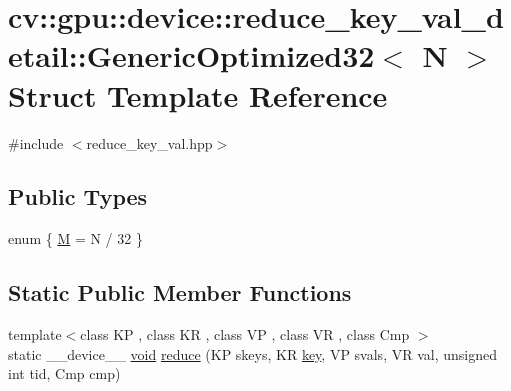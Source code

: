 \hypertarget{structcv_1_1gpu_1_1device_1_1reduce__key__val__detail_1_1GenericOptimized32}{\section{cv\-:\-:gpu\-:\-:device\-:\-:reduce\-\_\-key\-\_\-val\-\_\-detail\-:\-:Generic\-Optimized32$<$ N $>$ Struct Template Reference}
\label{structcv_1_1gpu_1_1device_1_1reduce__key__val__detail_1_1GenericOptimized32}
}


{\ttfamily \#include $<$reduce\-\_\-key\-\_\-val.\-hpp$>$}

\subsection*{Public Types}
\begin{DoxyCompactItemize}
\item 
enum \{ \hyperlink{structcv_1_1gpu_1_1device_1_1reduce__key__val__detail_1_1GenericOptimized32_a82fef71796e3b0cbae81fd2cb137751aa3d61d1be03bb945fc790c320a314b2bf}{M} = N / 32
 \}
\end{DoxyCompactItemize}
\subsection*{Static Public Member Functions}
\begin{DoxyCompactItemize}
\item 
{\footnotesize template$<$class K\-P , class K\-R , class V\-P , class V\-R , class Cmp $>$ }\\static \-\_\-\-\_\-device\-\_\-\-\_\- \hyperlink{legacy_8hpp_a8bb47f092d473522721002c86c13b94e}{void} \hyperlink{structcv_1_1gpu_1_1device_1_1reduce__key__val__detail_1_1GenericOptimized32_ac61f56ddcc428c76eb2c4f59c0007320}{reduce} (K\-P skeys, K\-R \hyperlink{core__c_8h_a68cf695b604d08c0b6f6f6bb282a6586}{key}, V\-P svals, V\-R val, unsigned int tid, Cmp cmp)
\end{DoxyCompactItemize}


